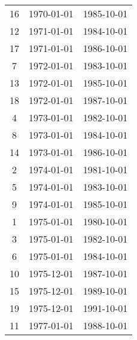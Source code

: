 % 
\begin{tabular}{ccc}
  \hline
  \hline
16 & 1970-01-01 & 1985-10-01 \\ 
  12 & 1971-01-01 & 1984-10-01 \\ 
  17 & 1971-01-01 & 1986-10-01 \\ 
  7 & 1972-01-01 & 1983-10-01 \\ 
  13 & 1972-01-01 & 1985-10-01 \\ 
  18 & 1972-01-01 & 1987-10-01 \\ 
  4 & 1973-01-01 & 1982-10-01 \\ 
  8 & 1973-01-01 & 1984-10-01 \\ 
  14 & 1973-01-01 & 1986-10-01 \\ 
  2 & 1974-01-01 & 1981-10-01 \\ 
  5 & 1974-01-01 & 1983-10-01 \\ 
  9 & 1974-01-01 & 1985-10-01 \\ 
  1 & 1975-01-01 & 1980-10-01 \\ 
  3 & 1975-01-01 & 1982-10-01 \\ 
  6 & 1975-01-01 & 1984-10-01 \\ 
  10 & 1975-12-01 & 1987-10-01 \\ 
  15 & 1975-12-01 & 1989-10-01 \\ 
  19 & 1975-12-01 & 1991-10-01 \\ 
  11 & 1977-01-01 & 1988-10-01 \\ 
   \hline
\end{tabular}
